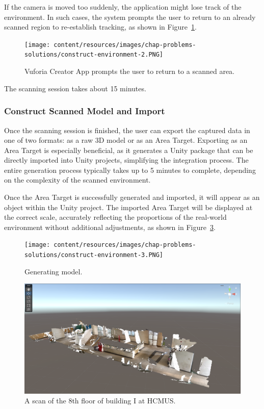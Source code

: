 If the camera is moved too suddenly, the application might lose track of the environment. In such cases, the system prompts the user to return to an already scanned region to re-establish tracking, as shown in Figure~\ref{fig:construct-environment-2}.

\begin{figure}[ht]
  \centering
  \texttt{[image: content/resources/images/chap-problems-solutions/construct-environment-2.PNG]}
  \caption{Vuforia Creator App prompts the user to return to a scanned area.}
  \label{fig:construct-environment-2}
\end{figure}

The scanning session takes about 15 minutes.

\subsubsection{Construct Scanned Model and Import}
Once the scanning session is finished, the user can export the captured data in one of two formats: as a raw 3D model or as an Area Target. Exporting as an Area Target is especially beneficial, as it generates a Unity package that can be directly imported into Unity projects, simplifying the integration process. The entire generation process typically takes up to 5 minutes to complete, depending on the complexity of the scanned environment.

Once the Area Target is successfully generated and imported, it will appear as an object within the Unity project. The imported Area Target will be displayed at the correct scale, accurately reflecting the proportions of the real-world environment without additional adjustments, as shown in Figure~\ref{fig:construct-environment-4}.

\begin{figure}[ht]
  \centering
  \texttt{[image: content/resources/images/chap-problems-solutions/construct-environment-3.PNG]}
  \caption{Generating model.}
  \label{fig:construct-environment-3}
\end{figure}

\begin{figure}[ht]
  \centering
  \includegraphics[scale=0.3]{content/resources/images/chap-problems-solutions/construct-environment-4.PNG}
  \caption{A scan of the 8th floor of building I at HCMUS.}
  \label{fig:construct-environment-4}
\end{figure}

